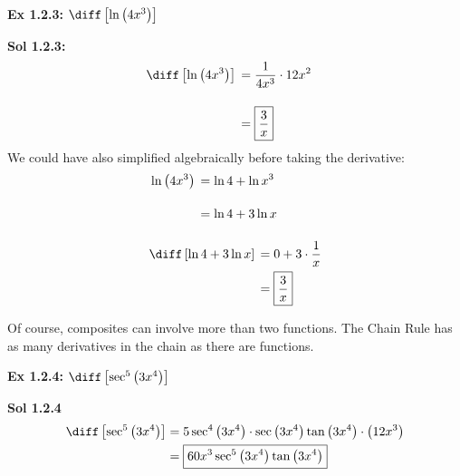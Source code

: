 \begin{tcolorbox}[example]
    \textbf{Ex 1.2.3: } $\diff \left[\ln \left(4x^3\right)\right]$ 
\end{tcolorbox}
\begin{tcolorbox}[solution]
    \textbf{Sol 1.2.3: } \begin{align*}
        & \diff \left[\ln \left(4x^3\right)\right] \begin{aligned}[t]
            & = \dfrac{1}{4x^3} \cdot 12x^2 \\[11pt]
            & = \boxed{\dfrac{3}{x}} 
        \end{aligned}
    \end{align*} 
    We could have also simplified algebraically before taking the derivative: \begin{align*}
        & \ln \left(4x^3\right) \begin{aligned}[t]
            & = \ln 4 + \ln x^3 \\[11pt]
            & = \ln 4 + 3\ln x 
        \end{aligned} \\[11pt]
        & \diff \left[\ln 4 + 3\ln x\right] \begin{aligned}[t]
            & = 0 + 3 \cdot \dfrac{1}{x} \\
            & = \boxed{\dfrac{3}{x}}
        \end{aligned}
    \end{align*}
\end{tcolorbox}

Of course, composites can involve more than two functions. The Chain Rule has as many derivatives in the chain as there are functions. \par

\begin{tcolorbox}[example]
    \textbf{Ex 1.2.4: } $\diff \left[\sec^5 \left(3x^4\right)\right]$ 
\end{tcolorbox}
\begin{tcolorbox}[solution]
    \textbf{Sol 1.2.4 } \begin{align*}
        \diff \left[\sec^5 \left(3x^4\right)\right] & = 5\sec^4 \left(3x^4\right) \cdot \sec \left(3x^4\right) \tan \left(3x^4\right) \cdot \left(12x^3\right) \\
        & = \boxed{60x^3\sec^5 \left(3x^4\right)\tan \left(3x^4\right)}
    \end{align*}
\end{tcolorbox} \vspace{11pt}

